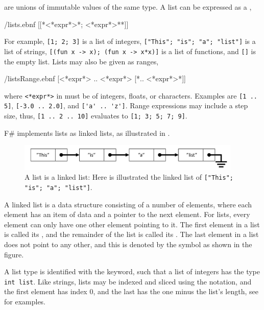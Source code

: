 \documentclass[fsharpNotes.tex]{subfiles}
\begin{document}
 are unions of immutable values of the same type. A list can be expressed as a ,
%
\begin{verbatimwrite}{\ebnf/lists.ebnf}
[[*<*expr*>{*; <*expr*>*}*]]
\end{verbatimwrite}
%
For example, \mbox{\lstinline![1; 2; 3]!} is a list of integers, \mbox{\lstinline!["This"; "is"; "a"; "list"]!} is a list of strings, \mbox{\lstinline![(fun x -> x); (fun x -> x*x)]!} is a list of functions, and \lstinline![]! is the empty list. Lists may also be given as ranges,
%
\begin{verbatimwrite}{\ebnf/listsRange.ebnf}
[<*expr*> .. <*expr*> [*.. <*expr*>*]]
\end{verbatimwrite}
%
where \lstinline[language=syntax]{<*expr*>} in  must be of integers, floats, or characters. Examples are \mbox{\lstinline![1 .. 5]!}, \mbox{\lstinline![-3.0 .. 2.0]!}, and \mbox{\lstinline!['a' .. 'z']!}. Range expressions may include a step size, thus, \mbox{\lstinline![1 .. 2 .. 10]!} evaluates to \mbox{\lstinline![1; 3; 5; 7; 9]!}.

F\# implements lists as linked lists, as illustrated in .
\begin{figure}
  \centering
  \includegraphics[width=0.95\textwidth]{linkedList}
  \caption{A list is a linked list: Here is illustrated the linked list of \mbox{\lstinline!["This"; "is"; "a"; "list"]!}.}
  \label{fig:linkedList}
\end{figure}
A linked list is a data structure consisting of a number of elements, where each element has an item of data and a pointer to the next element. For lists, every element can only have one other element pointing to it. The first element in a list is called its , and the remainder of the list is called its . The last element in a list does not point to any other, and this is denoted by the  symbol as shown in the figure. 

A list type is identified with the  keyword, such that a list of integers has the type \lstinline!int list!. Like strings, lists may be indexed and sliced using the \idx[{[]}@\lstinline{[]}]{\lexeme{[]}} notation, and the first element has index 0, and the last has the one minus the list's length, see  for examples.
%
%
\end{document}
